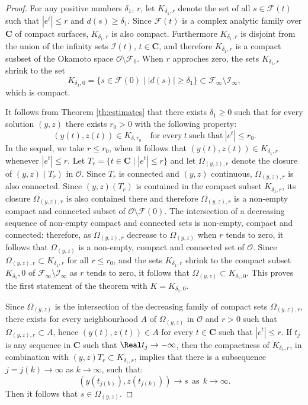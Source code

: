 \begin{proof}
For any positive numbers $\delta_1$, $r$, let $K_{\delta_1,r}$ denote the set of all $s\in\mathcal{F}(t)$ such that $|e^t|\le r$ and $d(s)\ge\delta_1$.
Since $\mathcal{F}(t)$ is a complex analytic family over $\mathbf{C}$ of compact surfaces, $K_{\delta_1,r}$ is also compact.
Furthermore $K_{\delta_1,r}$ is disjoint from the union of the infinity sets $\mathcal{I}(t)$, $t\in\mathbf{C}$, and therefore $K_{\delta_1,r}$ is a compact susbset of the Okamoto space $\mathcal{O}\setminus\mathcal{F}_{0}$.
When $r$ approches zero, the sets $K_{\delta_1,r}$ shrink to the set
$$
K_{\delta_1,0}=\{ s\in\mathcal{F}(0) \mid |d(s)|\ge\delta_1\}\subset\mathcal{F}_{\infty}\setminus\mathcal{I}_{\infty},
$$
which is compact.

It follows from Theorem \ref{th:estimates} that there exists $\delta_1\ge0$ such that for every solution $(y,z)$ there exists $r_0>0$ with the following property:
$$
(y(t),z(t))\in K_{\delta,r_0}
\quad
\text{for every}\ t\ \text{such that}\ |e^t|\le r_0.
$$
In the sequel, we take $r\le r_0$, when it follows that $(y(t),z(t))\in K_{\delta_1,r}$ whenever $|e^t|\le r$.
Let 
$T_r=\{t\in\mathbf{C}\mid |e^t|\le r\}$
and let $\Omega_{(y,z),r}$ denote the closure of $(y,z)(T_r)$ in $\mathcal{O}$.
Since $T_r$ is connected and $(y,z)$ continuous, $\Omega_{(y,z),r}$ is also connected.
Since $(y,z)(T_r)$ is contained in the compact subset $K_{\delta_1,r}$, its closure $\Omega_{(y,z),r}$ is also contained there and therefore $\Omega_{(y,z),r}$ is a non-empty compact and connected subset of $\mathcal{O}\setminus\mathcal{F}(0)$.
The intersection of a decreasing sequence of non-empty compact and connected sets is non-empty, compact and connected: therefore, as $\Omega_{(y,z),r}$ decrease to $\Omega_{(y,z)}$ when $r$ tends to zero, it follows that $\Omega_{(y,z)}$ is a non-empty, compact and connected set of $\mathcal{O}$.
Since $\Omega_{(y,z),r}\subset K_{\delta_1,r}$ for all $r\le r_0$, and the sets $K_{\delta_1,r}$ shrink to the compact subset $K_{\delta_1},0$ of $\mathcal{F}_{\infty}\setminus\mathcal{I}_{\infty}$ as $r$ tends to zero, it follows that $\Omega_{(y,z)}\subset K_{\delta_1,0}$.
This proves the first statement of the theorem with $K=K_{\delta_1,0}$.

Since $\Omega_{(y,z)}$ is the intersection of the decreasing family of compact sets $\Omega_{(y,z),r}$, there exists for every neighbourhood $A$ of $\Omega_{(y,z)}$ in $\mathcal{O}$ and $r>0$ such that $\Omega_{(y,z),r}\subset A$, hence $(y(t),z(t))\in A$ for every $t\in\mathbf{C}$ such that $|e^t|\le r$.
If $t_j$ is any sequence in $\mathbf{C}$ such that $\Real t_j\to-\infty$, then the compactness of $K_{\delta_1,r}$, in combination with $(y,z)T_r\subset K_{\delta_1,r}$, implies that there is a subsequence $j=j(k)\to\infty$ as $k\to\infty$, such that:
$$
(y(t_{j(k)}),z(t_{j(k)}))\to s
\ \ \text{as}\ \ k\to\infty.
$$
Then it follows that $s\in\Omega_{(y,z)}$.


\end{proof}
